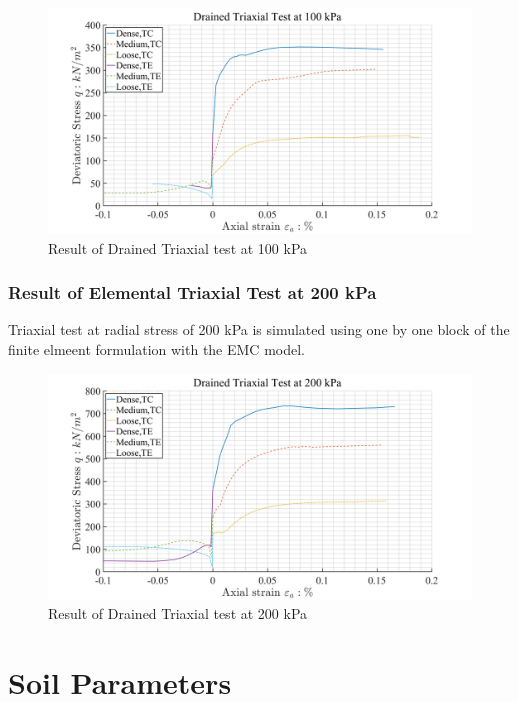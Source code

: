 \documentclass[a4paper, nobind]{templates/ociamthesis}
\begin{document}
\begin{figure}[H]
\includegraphics[width=1\linewidth]{myfigureeeeee/100} \caption{Result of Drained Triaxial test at 100 kPa}\label{fig:unnamed-chunk-11}
\end{figure}

\hypertarget{result-of-elemental-triaxial-test-at-200-kpa}{%
\subsubsection{Result of Elemental Triaxial Test at 200 kPa}\label{result-of-elemental-triaxial-test-at-200-kpa}}

Triaxial test at radial stress of 200 kPa is simulated using one by one block of the finite elmeent formulation with the EMC model.

\begin{figure}[H]
\includegraphics[width=1\linewidth]{myfigureeeeee/200} \caption{Result of Drained Triaxial test at 200 kPa}\label{fig:unnamed-chunk-12}
\end{figure}

\hypertarget{soil-parameters-1}{%
\section{Soil Parameters}\label{soil-parameters-1}}
\end{document}
